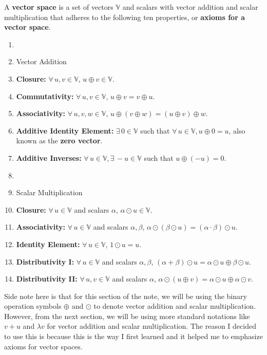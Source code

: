 \documentclass[../main.tex]{subfiles}
\begin{document}
\begin{definition}
A \textbf{vector space} is a set of vectors $\mathbb{V}$ and scalars
with vector addition and scalar multiplication that adheres to the
following ten properties, or \textbf{axioms for a vector space}.
\begin{enumerate}[noitemsep]
\item[]
\item[] Vector Addition
\item[A1.] \textbf{Closure:}
$\forall \, u, v \in \mathbb{V}$, $u \oplus v \in \mathbb{V}$.
\item[A2.] \textbf{Commutativity:}
$\forall \, u, v \in \mathbb{V}$, $u \oplus v = v \oplus u$.
\item[A3.] \textbf{Associativity:}
$\forall \, u, v, w \in \mathbb{V}$, $u \oplus (v \oplus w) =
(u \oplus v) \oplus w$.
\item[A4.] \textbf{Additive Identity Element:}
$\exists \, 0 \in \mathbb{V}$ such that $\forall \, u \in \mathbb{V},
u \oplus 0 = u$, also known as the \textbf{zero vector}.
\item[A5.] \textbf{Additive Inverses:}
$\forall \, u \in \mathbb{V}, \exists \, -u \in \mathbb{V}$ such that
$u \oplus (-u) = 0$.
\item[]
\item[] Scalar Multiplication
\item[S1.] \textbf{Closure:}
$\forall \, u \in \mathbb{V}$ and scalars $\alpha$, $\alpha \odot
u \in \mathbb{V}$.
\item[S2.] \textbf{Associativity:}
$\forall \, u \in \mathbb{V}$ and scalars $\alpha, \beta$,
$\alpha \odot (\beta \odot u) = (\alpha \cdot \beta) \odot u$.
\item[S3.] \textbf{Identity Element:}
$\forall \, u \in \mathbb{V}$, $1 \odot u = u$.
\item[S4.] \textbf{Distributivity I:}
$\forall \, u \in \mathbb{V}$ and scalars $\alpha, \beta$,
$(\alpha + \beta) \odot u = \alpha \odot u \oplus
\beta \odot u$.
\item[S5.] \textbf{Distributivity II:}
$\forall \, u, v \in \mathbb{V}$ and scalars $\alpha$,
$\alpha \odot (u \oplus v) = \alpha \odot u \oplus \alpha \odot v$.
\end{enumerate}
\end{definition}

Side note here is that for this section of the note, we will be using
the binary operation symbols $\oplus$ and $\odot$ to denote vector
addition and scalar multiplication. However, from the next section,
we will be using more standard notations like $v + u$ and $\lambda v$
for vector addition and scalar multiplication. The reason I decided to
use this is because this is the way I first learned and it helped me
to emphasize axioms for vector spaces.
\end{document}
